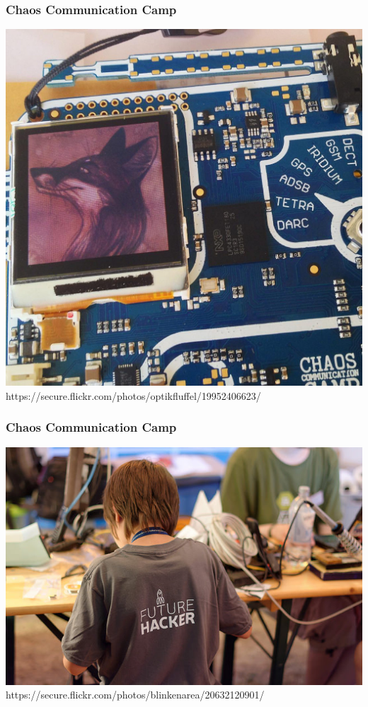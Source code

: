 \documentclass[12pt]{beamer}
\newcommand{\license}[2][]{\\#2\ifthenelse{\equal{#1}{}}{}{\\\scriptsize\url{#1}}}
\begin{document}
	\begin{frame}
		\frametitle{Chaos Communication Camp}
		\begin{minipage}{\linewidth}
			\centering
			\includegraphics[height=0.7\textheight]{img//camp2015-badge.jpg}
			\tiny\license{https://secure.flickr.com/photos/optikfluffel/19952406623/}
		\end{minipage}
	\end{frame}	
	\begin{frame}
		\frametitle{Chaos Communication Camp}
		\begin{minipage}{\linewidth}
			\centering
			\includegraphics[height=0.7\textheight]{img//camp2015-future-hacker.jpg}
			\tiny\license{https://secure.flickr.com/photos/blinkenarea/20632120901/}
		\end{minipage}
	\end{frame}
\end{document}
